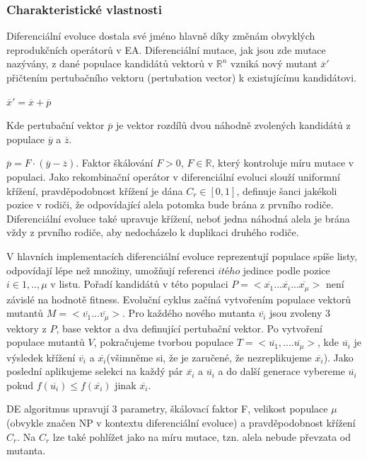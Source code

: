 \subsubsection{Charakteristické vlastnosti}
Diferenciální evoluce dostala své jméno hlavně díky změnám obvyklých reprodukčních operátorů v EA. Diferenciální mutace, jak jsou zde mutace nazývány, z dané populace kandidátů vektorů v $\mathbb{R}^n$ vzniká nový mutant $\overline{x}'$ přičtením pertubačního vektoru (pertubation vector) k existujícímu kandidátovi. \par
$\overline{x}'=\overline{x}+\overline{p}$
\par
Kde pertubační vektor $\overline{p}$ je vektor rozdílů dvou náhodně zvolených kandidátů z populace $\overline{y}$ a $\overline{z}$.  \par 
$\overline{p}=F \cdot (\overline{y}-\overline{z})$.
 Faktor škálování $F > 0$, $F \in \mathbb{R}$, který kontroluje míru mutace v populaci. Jako rekombinační operátor v diferenciální evoluci slouží uniformní křížení, pravděpodobnost křížení je dána $C_r \in [0,1]$, definuje šanci jakékoli pozice v rodiči, že odpovídající alela potomka bude brána z prvního rodiče. Diferenciální evoluce také upravuje křížení, neboť jedna náhodná alela je brána vždy z prvního rodiče, aby nedocházelo k duplikaci druhého rodiče. \par 
V hlavních implementacích diferenciální evoluce reprezentují populace spíše listy, odpovídají lépe než množiny, umožňují referenci $itého$ jedince podle pozice $i\in{1, .., \mu}$ v listu. Pořadí kandidátů v této populaci $P=<\overline{x_1}...\overline{x_i}...\overline{x_{\mu}}>$ není závislé na hodnotě fitness. Evoluční cyklus začíná vytvořením populace vektorů mutantů $M=<\overline{v_1}...\overline{v_{\mu}}>$. Pro každého nového mutanta $\overline{v_i}$ jsou zvoleny 3 vektory z $P$, base vektor a dva definující pertubační vektor. Po vytvoření populace mutantů $V$, pokračujeme tvorbou populace $T=<\overline{u_1},....\overline{u_{\mu}}>$, kde $\overline{u_i}$ je výsledek křížení $\overline{v_i}$ a $\overline{x_i}$(všimněme si, že je zaručené, že nezreplikujeme $\overline{x_i}$). Jako poslední aplikujeme selekci na každý pár $\overline{x_i}$ a $\overline{u_i}$ a do další generace vybereme $\overline{u_i}$ pokud $f(\overline{u_i}) \leq f(\overline{x_i})$ jinak $\overline{x_i}$. \par 
DE algoritmus upravují 3 parametry, škálovací faktor F, velikost populace $\mu$ (obvykle značen NP v kontextu diferenciální evoluce) a pravděpodobnost křížení $C_r$. Na $C_r$ lze také pohlížet jako na míru mutace, tzn. alela nebude převzata od mutanta.\par

